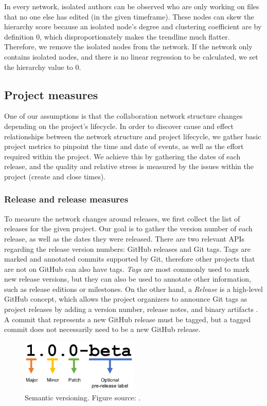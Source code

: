 In every network, isolated authors can be observed who are only working on files that no one else has edited (in the given timeframe). These nodes can skew the hierarchy score because an isolated node's degree and clustering coefficient are by definition 0, which disproportionately makes the trendline much flatter. Therefore, we remove the isolated nodes from the network. If the network only contains isolated nodes, and there is no linear regression to be calculated, we set the hierarchy value to 0.

\subsection{Project measures}

One of our assumptions is that the collaboration network structure changes depending on the project's lifecycle. In order to discover cause and effect relationships between the network structure and project lifecycle, we gather basic project metrics to pinpoint the time and date of events, as well as the effort required within the project. We achieve this by gathering the dates of each release, and the quality and relative stress is measured by the issues within the project (create and close times).

\subsubsection{Release and release measures}

To measure the network changes around releases, we first collect the list of releases for the given project. Our goal is to gather the version number of each release, as well as the dates they were released. There are two relevant APIs regarding the release version numbers: GitHub releases and Git tags. Tags are marked and annotated commits supported by Git, therefore other projects that are not on GitHub can also have tags. \textit{Tags} are most commonly used to mark new release versions, but they can also be used to annotate other information, such as release editions or milestones. On the other hand, a \textit{Release} is a high-level GitHub concept, which allows the project organizers to announce Git tags as project releases by adding a version number, release notes, and binary artifacts \cite{olsonReleaseYourSoftware2013}. A commit that represents a new GitHub release must be tagged, but a tagged commit does not necessarily need to be a new GitHub release.

\begin{figure}
    \centering
    \includegraphics[width=0.5\textwidth]{figures/semantic-versioning.png}
    \caption{Semantic versioning. Figure source: \cite{mariogripSemanticVersioningUT2018}.}
    \label{fig:semver}
\end{figure}

